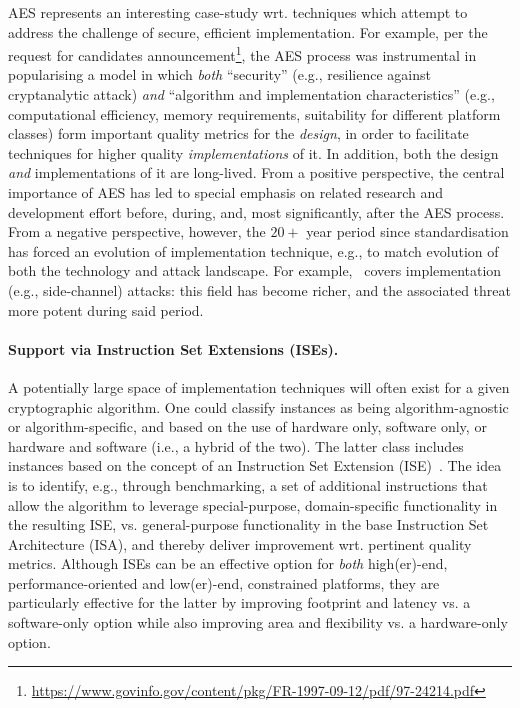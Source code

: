 AES represents an interesting case-study wrt. techniques which attempt to 
address the challenge of secure, efficient implementation.  For example,
per the request for candidates announcement\footnote{%
\url{https://www.govinfo.gov/content/pkg/FR-1997-09-12/pdf/97-24214.pdf}
}, the AES process was instrumental in popularising a model in which
{\em both}
``security''
(e.g., resilience against cryptanalytic attack)
{\em and}
``algorithm and implementation characteristics''
(e.g., computational efficiency, memory requirements, suitability for different platform classes)
form important quality metrics for the {\em design}, in order to facilitate
techniques for higher quality {\em implementations} of it.
In addition,
both the design {\em and} implementations of it are long-lived.
From a positive perspective, 
the central importance of AES has led to special emphasis on related
research and development effort before, during, and, most significantly, 
after the AES process.
From a negative perspective, however,
the $20+$ year period since standardisation has forced an evolution of 
implementation technique, e.g., to match evolution of both the technology 
and attack landscape.  For example,~\cite[Section 3.6]{NBBBDFR:01} covers
implementation (e.g., side-channel) attacks: this field has become richer,
and the associated threat more potent during said period.


\paragraph{Support via Instruction Set Extensions (ISEs).}

A potentially large space of implementation techniques will often exist
for a given cryptographic algorithm.  One could classify instances as being 
   algorithm-agnostic
   or
   algorithm-specific,
and based on the use of   
   hardware              only,
                software only,
   or
   hardware and software (i.e., a hybrid of the two).
The latter class includes instances based on the concept of an
Instruction Set Extension (ISE)~\cite{GalBer:11,BarGioMar:09,RegIen:16}.
The idea is to identify, e.g., through benchmarking, a set of additional 
instructions that allow the algorithm to leverage
special-purpose, domain-specific functionality
in the resulting ISE,
vs. 
general-purpose                  functionality
in the base Instruction Set Architecture (ISA),
and thereby deliver improvement wrt. pertinent quality metrics.  
Although ISEs can be an effective option for {\em both}
high(er)-end, performance-oriented
and
 low(er)-end, constrained
platforms, 
they are particularly effective for the latter by 
improving footprint and latency
vs. a software-only option
while also
improving area      and flexibility
vs. a hardware-only option.

